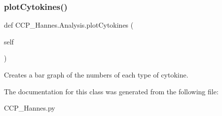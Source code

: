 \subsubsection{\texorpdfstring{plot\+Cytokines()}{plotCytokines()}}
{\footnotesize\ttfamily def C\+C\+P\+\_\+\+Hannes.\+Analysis.\+plot\+Cytokines (\begin{DoxyParamCaption}\item[{}]{self }\end{DoxyParamCaption})}



Creates a bar graph of the numbers of each type of cytokine. 



The documentation for this class was generated from the following file\+:\begin{DoxyCompactItemize}
\item 
C\+C\+P\+\_\+\+Hannes.\+py\end{DoxyCompactItemize}
